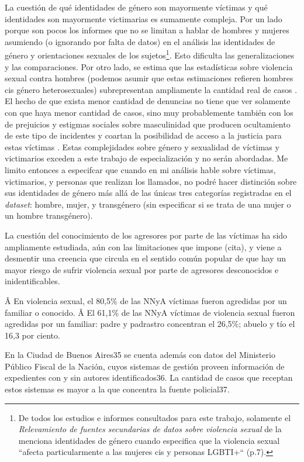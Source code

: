 \documentclass[10 pt]{article}
\begin{document}
La cuestión de qué identidades de género son mayormente víctimas y qué identidades son mayormente victimarias es sumamente compleja. Por un lado porque son pocos los informes que no se limitan a hablar de hombres y mujeres asumiendo (o ignorando por falta de datos) en el análisis las identidades de género y orientaciones sexuales de los sujetos\footnote{De todos los estudios e informes consultados para este trabajo, solamente el \textit{Relevamiento de fuentes secundarias de datos sobre violencia sexual} de la \citet{ufem_relevamiento} menciona identidades de género cuando especifica que la violencia sexual “afecta particularmente a las mujeres cis y personas LGBTI+“ (p.7).}. Esto dificulta las generalizaciones y las comparaciones. Por otro lado, se estima que las estadísticas sobre violencia sexual contra hombres (podemos asumir que estas estimaciones refieren hombres cis género heterosexuales) subrepresentan ampliamente la cantidad real de casos \citep*[p.~149]{ferris2002world}. El hecho de que exista menor cantidad de denuncias no tiene que ver solamente con que haya menor cantidad de casos, sino muy probablemente también con los de prejuicios y estigmas sociales sobre masculinidad que producen ocultamiento de este tipo de incidentes y coartan la posibilidad de acceso a la justicia para estas víctimas \citep*[p.~149]{ferris2002world}. Estas complejidades sobre género y sexualidad de víctimas y victimarios exceden a este trabajo de especialización y no serán abordadas. Me limito entonces a especifcar que cuando en mi análisis hable sobre víctimas, victimarios, y personas que realizan los llamados, no podré hacer distinción sobre sus identidades de género más allá de las únicas tres categorías registradas en el \textit{dataset}: hombre, mujer, y transgénero (sin especificar si se trata de una mujer o un hombre transgénero).  

La cuestión del conocimiento de los agresores por parte de las víctimas ha sido ampliamente estudiada, aún con las limitaciones que impone (cita), y viene a desmentir una creencia que circula en el sentido común popular de que hay un mayor riesgo de sufrir violencia sexual por parte de agresores desconocidos e inidentificables.  

Â En violencia sexual, el 80,5\% de las NNyA víctimas fueron agredidas por un familiar o conocido.
Â El 61,1\% de las NNyA víctimas de violencia sexual fueron agredidas por un familiar: padre y padrastro concentran el 26,5\%; abuelo y tío el 16,3 por ciento.

En la Ciudad de Buenos Aires35 se cuenta además con datos del Ministerio Público Fiscal de la Nación,
cuyos sistemas de gestión proveen información de expedientes con y sin autores identificados36. La
cantidad de casos que receptan estos sistemas es mayor a la que concentra la fuente policial37. 
\end{document}
